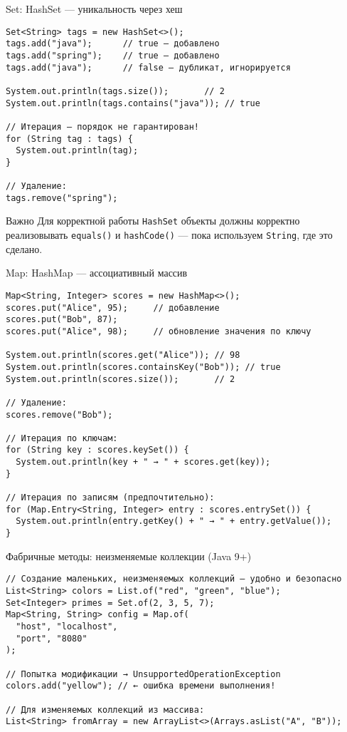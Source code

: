 \documentclass[aspectratio=169]{beamer}
\begin{document}
\begin{frame}[fragile]{Set: HashSet — уникальность через хеш}
\lstset{language=JavaLite}
\begin{lstlisting}
Set<String> tags = new HashSet<>();
tags.add("java");      // true — добавлено
tags.add("spring");    // true — добавлено
tags.add("java");      // false — дубликат, игнорируется

System.out.println(tags.size());       // 2
System.out.println(tags.contains("java")); // true

// Итерация — порядок не гарантирован!
for (String tag : tags) {
  System.out.println(tag);
}

// Удаление:
tags.remove("spring");
\end{lstlisting}
  \begin{block}{Важно}
    Для корректной работы \texttt{HashSet} объекты должны корректно реализовывать \texttt{equals()} и \texttt{hashCode()} — пока используем \texttt{String}, где это сделано.
  \end{block}
\end{frame}

\begin{frame}[fragile]{Map: HashMap — ассоциативный массив}
\lstset{language=JavaLite}
\begin{lstlisting}
Map<String, Integer> scores = new HashMap<>();
scores.put("Alice", 95);     // добавление
scores.put("Bob", 87);
scores.put("Alice", 98);     // обновление значения по ключу

System.out.println(scores.get("Alice")); // 98
System.out.println(scores.containsKey("Bob")); // true
System.out.println(scores.size());       // 2

// Удаление:
scores.remove("Bob");

// Итерация по ключам:
for (String key : scores.keySet()) {
  System.out.println(key + " → " + scores.get(key));
}

// Итерация по записям (предпочтительно):
for (Map.Entry<String, Integer> entry : scores.entrySet()) {
  System.out.println(entry.getKey() + " → " + entry.getValue());
}
\end{lstlisting}
\end{frame}

\begin{frame}[fragile]{Фабричные методы: неизменяемые коллекции (Java 9+)}
\lstset{language=JavaLite}
\begin{lstlisting}
// Создание маленьких, неизменяемых коллекций — удобно и безопасно
List<String> colors = List.of("red", "green", "blue");
Set<Integer> primes = Set.of(2, 3, 5, 7);
Map<String, String> config = Map.of(
  "host", "localhost",
  "port", "8080"
);

// Попытка модификации → UnsupportedOperationException
colors.add("yellow"); // ← ошибка времени выполнения!

// Для изменяемых коллекций из массива:
List<String> fromArray = new ArrayList<>(Arrays.asList("A", "B"));
\end{lstlisting}
\end{frame}
\end{document}

